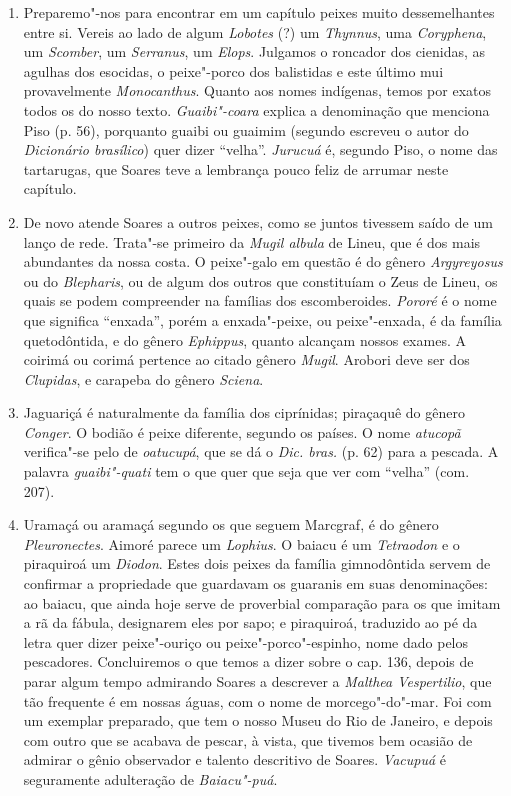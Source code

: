 \begin{enumerate}
\item  Preparemo"-nos para encontrar em um capítulo peixes muito 
dessemelhantes entre si. Vereis ao lado de algum \textit{Lobotes} (?) um \textit{Thynnus}, uma \textit{Coryphena}, 
um \textit{Scomber}, um \textit{Serranus}, um \textit{Elops}. Julgamos o roncador dos cienidas,
as agulhas dos esocidas, o peixe"-porco dos balistidas e este último mui 
provavelmente \textit{Monocanthus}. Quanto aos nomes indígenas, temos por exatos todos
os do nosso texto. \textit{Guaibi"-coara} explica a denominação que menciona
Piso (p. 56), porquanto guaibi ou guaimim (segundo escreveu o autor do
\textit{Dicionário brasílico}) quer dizer ``velha''.  \textit{Jurucuá} é, segundo Piso, o nome
das tartarugas, que Soares teve a lembrança pouco feliz de arrumar neste
capítulo.

\item  De novo atende Soares a outros peixes, como se juntos tivessem
saído de um lanço de rede. Trata"-se primeiro da \textit{Mugil albula} de Lineu,
que é dos mais abundantes da nossa costa. O peixe"-galo em questão é do gênero \textit{Argyreyosus} 
ou do \textit{Blepharis}, ou de algum dos 
outros que constituíam o Zeus de Lineu, os quais se podem compreender na famílias dos 
escomberoides. \textit{Pororé} é o nome que significa ``enxada'',  porém a enxada"-peixe, ou peixe"-enxada, é da família quetodôntida, 
e do gênero \textit{Ephippus}, quanto alcançam nossos exames. 
A coirimá ou corimá pertence ao citado gênero \textit{Mugil}. Arobori deve ser dos \textit{Clupidas}, e 
carapeba do gênero \textit{Sciena}.

\item  Jaguariçá é naturalmente da família dos ciprínidas; piraçaquê do
gênero \textit{Conger}. O bodião é peixe diferente, segundo os países. O nome
\textit{atucopã} verifica"-se pelo de \textit{oatucupá}, que se dá o \textit{Dic. bras.} (p. 62) para
a pescada. A palavra \textit{guaibi"-quati} tem o que quer que seja que ver com ``velha'' (com. 207).

\item Uramaçá ou aramaçá segundo os que seguem Marcgraf, é do gênero \textit{Pleuronectes}. 
Aimoré parece um \textit{Lophius}. O baiacu é um \textit{Tetraodon} e o piraquiroá 
um \textit{Diodon}. Estes dois peixes da família gimnodôntida servem de confirmar a 
propriedade que guardavam os guaranis em suas denominações: ao baiacu, que ainda 
hoje serve de proverbial comparação para os que imitam a rã da fábula, designarem 
eles por sapo; e piraquiroá, traduzido ao pé da letra quer dizer peixe"-ouriço ou 
peixe"-porco"-espinho, nome dado pelos pescadores. Concluiremos o que temos a dizer sobre o 
cap. 136, depois de parar algum tempo admirando Soares a descrever a \textit{Malthea Vespertilio}, 
que tão frequente é em nossas águas, com o nome de morcego"-do"-mar. Foi 
com um exemplar preparado, que tem o nosso Museu do Rio de Janeiro, e depois com 
outro que se acabava de pescar, à vista, que tivemos bem ocasião de admirar o gênio 
observador e talento descritivo de Soares. \textit{Vacupuá} é seguramente adulteração de 
\textit{Baiacu"-puá}.


\end{enumerate}

